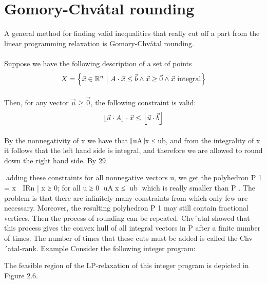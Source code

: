 \documentclass[titlepage]{book}
\theoremstyle{plain}
\theoremstyle{definition}
\theoremstyle{remark}
\begin{document}
\section{Gomory-Chv\'atal rounding}
A general method for finding valid inequalities that really cut off a part from the linear programming relaxation is Gomory-Chv\'atal rounding.

\paragraph{}
Suppose we have the following description of a set of points
\begin{equation}
X=\left\{ \vec{x}\in\mathbb{R}^n\ |\ A\cdot\vec{x}\leq\vec{b}\wedge\vec{x}\geq\vec{0}\wedge\vec{x}\mbox{ integral} \right\}
\end{equation}

\paragraph{}
Then, for any vector $\vec{u}\geq\vec{0}$, the following constraint is valid:
\begin{equation}
\left\lfloor \vec{u}\cdot A \right\rfloor\cdot\vec{x}\leq\left\lfloor \vec{u}\cdot\vec{b} \right\rfloor
\end{equation}

\paragraph{}
By the nonnegativity of x we have that ⌊uA⌋x ≤ ub, and from the integrality of x it follows that
the left hand side is integral, and therefore we are allowed to round down the right hand side. By
29

adding these constraints for all nonnegative vectors u, we get the polyhedron P 1 = {x ∈ IRn | x ≥
0; for all u ≥ 0 ⌊uA⌋x ≤ ⌊ub⌋} which is really smaller than P . The problem is that there are infinitely
many constraints from which only few are necessary. Moreover, the resulting polyhedron P 1 may still
contain fractional vertices. Then the process of rounding can be repeated. Chv´atal showed that this
process gives the convex hull of all integral vectors in P after a finite number of times. The number of
times that these cuts must be added is called the Chv´atal-rank.
Example Consider the following integer program:


The feasible region of the LP-relaxation of this integer program is depicted in Figure 2.6.
\end{document}

